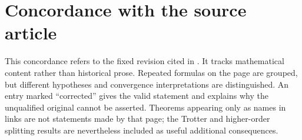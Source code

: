 \section{Concordance with the source article}\label{sec:coverage}
This concordance refers to the fixed revision cited in \cite{Wikipedia}. It tracks mathematical content rather than historical prose. Repeated formulas on the page are grouped, but different hypotheses and convergence interpretations are distinguished. An entry marked ``corrected'' gives the valid statement and explains why the unqualified original cannot be asserted. Theorems appearing only as names in links are not statements made by that page; the Trotter and higher-order splitting results are nevertheless included as useful additional consequences.

\begingroup\small
\renewcommand{\arraystretch}{1.2}
